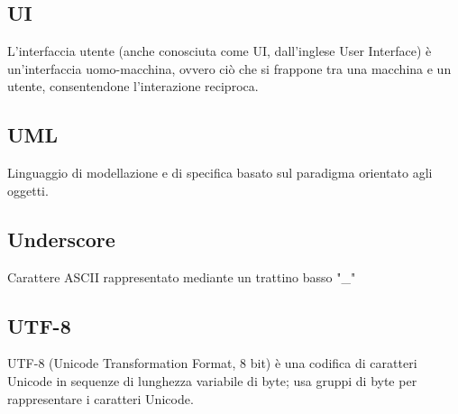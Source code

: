 \documentclass[../glossario.tex]{subfiles}
\begin{document}
\subsection*{UI}
{}
L'interfaccia utente (anche conosciuta come UI, dall'inglese User Interface) è un'interfaccia uomo-macchina, ovvero ciò che si frappone tra una macchina e un utente, consentendone l'interazione reciproca.


\subsection*{UML}
{}
Linguaggio di modellazione e di specifica basato sul paradigma orientato agli oggetti.

\subsection*{Underscore}
{}
Carattere ASCII rappresentato mediante un trattino basso "\_"

\subsection*{UTF-8}
{}
UTF-8 (Unicode Transformation Format, 8 bit) è una codifica di caratteri Unicode in sequenze di lunghezza variabile di byte; usa gruppi di byte per rappresentare i caratteri Unicode.
\end{document}
